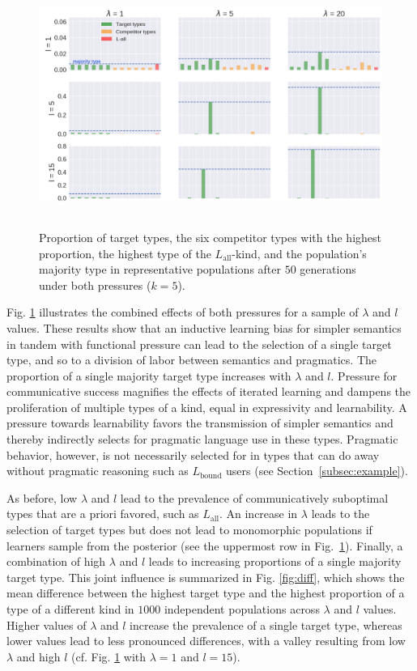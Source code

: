 \documentclass[a4paper, 11pt]{article}
\theoremstyle{Satz}
\newcommand{\mylang}[1]{\ensuremath{L_{\text{#1}}}\xspace} %
\newcommand{\Lall}{\mylang{all}}
\newcommand{\Lbound}{\mylang{bound}}
\begin{document}
\begin{figure}[t]
\centering
\includegraphics[width=1\textwidth,height=8cm,keepaspectratio]{./plots/alt-fig3-r+m}
\caption{Proportion of target types, the six competitor types with the highest proportion, the highest type of the $\Lall$-kind, and the population's majority type in representative populations after $50$ generations under both pressures ($k = 5$).}
\label{fig:rmd}
\end{figure}

Fig. \ref{fig:rmd} illustrates the combined effects of both pressures for a sample of
$\lambda$ and $l$ values. These results show that an inductive learning bias for simpler
semantics in tandem with functional pressure can lead to the selection of a single target
type, and so to a division of labor between semantics and pragmatics.
The proportion of a single majority target type increases with $\lambda$ and
$l$. Pressure for communicative success magnifies the effects of iterated learning and dampens
the proliferation of multiple types of a kind, equal in expressivity and learnability. A pressure towards learnability favors the transmission of simpler semantics and thereby indirectly selects for pragmatic language use in these types. Pragmatic behavior, however, is not necessarily selected for in types that can do away without pragmatic reasoning such as $\Lbound$ users (see Section~\ref{subsec:example}). 

As before, low $\lambda$ and $l$ lead to the prevalence of communicatively suboptimal types
that are a priori favored, such as $\Lall$. An increase in $\lambda$ leads to the selection of
target types but does not lead to monomorphic populations if learners sample from the posterior (see the uppermost row in Fig.~\ref{fig:rmd}). Finally, a combination of high $\lambda$ and $l$ leads to increasing proportions of a single majority target type. This joint influence is summarized in Fig. \ref{fig:diff}, which shows the mean difference between the highest target type and the highest proportion of a type of a different kind in $1000$ independent populations across $\lambda$ and $l$ values. Higher values of $\lambda$ and $l$ increase the prevalence of a single target type, whereas lower values lead to less pronounced differences, with a valley resulting from low $\lambda$ and high $l$ (cf. Fig. \ref{fig:rmd} with $\lambda = 1$ and $l=15$). 
\end{document}
